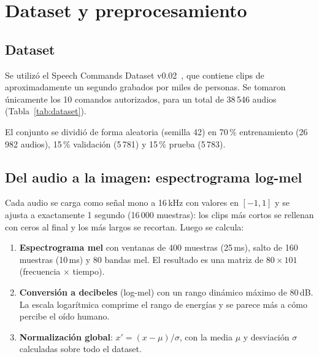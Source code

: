\documentclass[conference]{IEEEtran}
\begin{document}
\section{Dataset y preprocesamiento}

\subsection{Dataset}
Se utilizó el Speech Commands Dataset v0.02~\cite{warden2018}, que contiene clips de aproximadamente un segundo grabados por miles de personas. Se tomaron únicamente los 10 comandos autorizados, para un total de 38\,546 audios (Tabla~\ref{tab:dataset}).

\begin{table}[htbp]
\caption{Cantidad de audios por comando}
\label{tab:dataset}
\centering
{}
\end{table}

El conjunto se dividió de forma aleatoria (semilla 42) en 70\,\% entrenamiento (26\,982 audios), 15\,\% validación (5\,781) y 15\,\% prueba (5\,783).

\subsection{Del audio a la imagen: espectrograma log-mel}
Cada audio se carga como señal mono a 16\,kHz con valores en $[-1, 1]$ y se ajusta a exactamente 1 segundo (16\,000 muestras): los clips más cortos se rellenan con ceros al final y los más largos se recortan. Luego se calcula:

\begin{enumerate}
  \item \textbf{Espectrograma mel} con ventanas de 400 muestras (25\,ms), salto de 160 muestras (10\,ms) y 80 bandas mel. El resultado es una matriz de $80 \times 101$ (frecuencia $\times$ tiempo).
  \item \textbf{Conversión a decibeles} (log-mel) con un rango dinámico máximo de 80\,dB. La escala logarítmica comprime el rango de energías y se parece más a cómo percibe el oído humano.
  \item \textbf{Normalización global}: $x' = (x - \mu)/\sigma$, con la media $\mu$ y desviación $\sigma$ calculadas sobre todo el dataset.
\end{enumerate}
\end{document}
